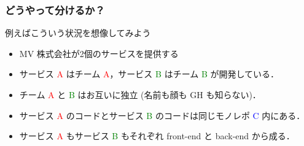 \begin{frame}
    \frametitle{どうやって分けるか？}
    例えばこういう状況を想像してみよう
    \begin{itemize}
        \item<2-> MV 株式会社が2個のサービスを提供する
        \item<3-> サービス \textcolor{red}{A} はチーム \textcolor{red}{A}，サービス \textcolor{green}{B} はチーム \textcolor{green}{B} が開発している．
        \item<5-> チーム \textcolor{red}{A} と \textcolor{green}{B} はお互いに独立 (名前も顔も GH も知らない)．
        \item<6-> サービス \textcolor{red}{A} のコードとサービス \textcolor{green}{B} のコードは同じモノレポ \textcolor{blue}{C} 内にある．
        \item<7-> サービス \textcolor{red}{A} もサービス \textcolor{green}{B} もそれぞれ front-end と back-end から成る．
    \end{itemize}
\end{frame}
